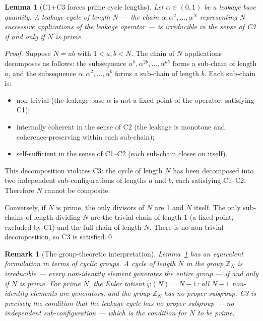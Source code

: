 \documentclass[12pt,a4paper]{article}
\newtheorem{lemma}[theorem]{Lemma}
\newtheorem{remark}[theorem]{Remark}
\newcommand{\vp}{\varphi}
\begin{document}
\begin{lemma}[C1+C3 forces prime cycle lengths]
\label{lem:prime}
Let $\alpha \in (0,1)$ be a leakage base quantity. A leakage cycle of length $N$ — the chain $\alpha, \alpha^2, \ldots, \alpha^N$ representing $N$ successive applications of the leakage operator — is irreducible in the sense of C3 if and only if $N$ is prime.
\end{lemma}

\begin{proof}
Suppose $N = ab$ with $1 < a, b < N$. The chain of $N$ applications decomposes as follows: the subsequence $\alpha^b, \alpha^{2b}, \ldots, \alpha^{ab}$ forms a sub-chain of length $a$, and the subsequence $\alpha, \alpha^2, \ldots, \alpha^b$ forms a sub-chain of length $b$. Each sub-chain is:
\begin{itemize}[leftmargin=2em]
\item non-trivial (the leakage base $\alpha$ is not a fixed point of the operator, satisfying C1);
\item internally coherent in the sense of C2 (the leakage is monotone and coherence-preserving within each sub-chain);
\item self-sufficient in the sense of C1--C2 (each sub-chain closes on itself).
\end{itemize}
This decomposition violates C3: the cycle of length $N$ has been decomposed into two independent sub-configurations of lengths $a$ and $b$, each satisfying C1--C2. Therefore $N$ cannot be composite.

Conversely, if $N$ is prime, the only divisors of $N$ are 1 and $N$ itself. The only sub-chains of length dividing $N$ are the trivial chain of length 1 (a fixed point, excluded by C1) and the full chain of length $N$. There is no non-trivial decomposition, so C3 is satisfied.\qed
\end{proof}

\begin{remark}[The group-theoretic interpretation]
Lemma~\ref{lem:prime} has an equivalent formulation in terms of cyclic groups. A cycle of length $N$ in the group $\mathbb{Z}_N$ is irreducible — every non-identity element generates the entire group — if and only if $N$ is prime. For prime $N$, the Euler totient $\vp(N) = N-1$: all $N-1$ non-identity elements are generators, and the group $\mathbb{Z}_N$ has no proper subgroup. C3 is precisely the condition that the leakage cycle has no proper subgroup — no independent sub-configuration — which is the condition for $N$ to be prime.
\end{remark}
\end{document}
